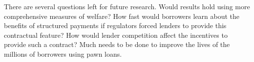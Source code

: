 \documentclass[12pt, a4paper, colorinlistoftodos]{article}
\begin{document}








There are several questions left for future research. Would results hold using more comprehensive measures of welfare? How fast would borrowers learn about the benefits of structured payments if regulators forced lenders to provide this contractual feature? How would lender competition affect the incentives to provide such a contract? Much needs to be done to improve the lives of the millions of borrowers using pawn loans.
\end{document}
